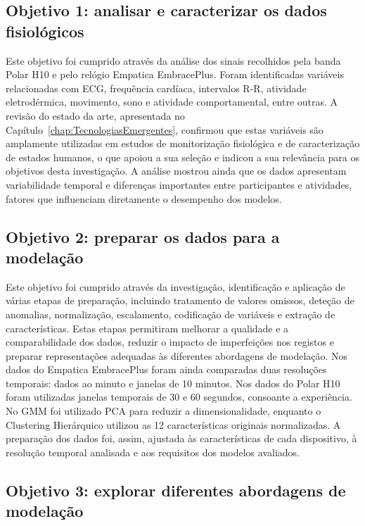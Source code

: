 \subsection*{Objetivo 1: analisar e caracterizar os dados fisiológicos}

Este objetivo foi cumprido através da análise dos sinais recolhidos pela banda Polar H10 e pelo relógio Empatica EmbracePlus. Foram identificadas variáveis relacionadas com ECG, frequência cardíaca, intervalos R-R, atividade eletrodérmica, movimento, sono e atividade comportamental, entre outras. A revisão do estado da arte, apresentada no Capítulo~\ref{chap:TecnologiasEmergentes}, confirmou que estas variáveis são amplamente utilizadas em estudos de monitorização fisiológica e de caracterização de estados humanos, o que apoiou a sua seleção e indicou a sua relevância para os objetivos desta investigação. A análise mostrou ainda que os dados apresentam variabilidade temporal e diferenças importantes entre participantes e atividades, fatores que influenciam diretamente o desempenho dos modelos.

\subsection*{Objetivo 2: preparar os dados para a modelação}

Este objetivo foi cumprido através da investigação, identificação e aplicação de várias etapas de preparação, incluindo tratamento de valores omissos, deteção de anomalias, normalização, escalamento, codificação de variáveis e extração de características. Estas etapas permitiram melhorar a qualidade e a comparabilidade dos dados, reduzir o impacto de imperfeições nos registos e preparar representações adequadas às diferentes abordagens de modelação. Nos dados do Empatica EmbracePlus foram ainda comparadas duas resoluções temporais: dados ao minuto e janelas de 10 minutos. Nos dados do Polar H10 foram utilizadas janelas temporais de 30 e 60 segundos, consoante a experiência. No GMM foi utilizado PCA para reduzir a dimensionalidade, enquanto o Clustering Hierárquico utilizou as 12 características originais normalizadas. A preparação dos dados foi, assim, ajustada às características de cada dispositivo, à resolução temporal analisada e aos requisitos dos modelos avaliados.

\subsection*{Objetivo 3: explorar diferentes abordagens de modelação}

